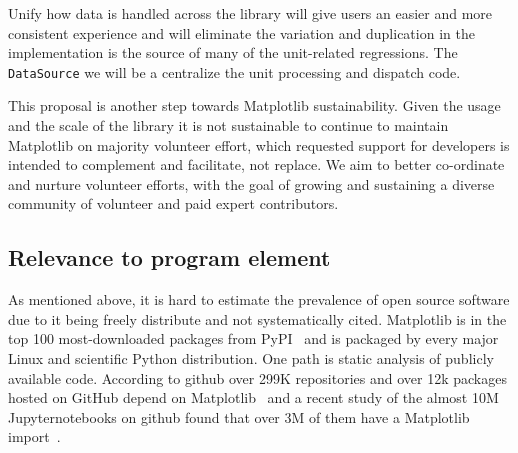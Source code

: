 \documentclass[12pt]{article}
\numberwithin{page}{section}
\begin{document}
Unify how data is handled across the library will give users an easier
and more consistent experience and will eliminate the variation and
duplication in the implementation is the source of many of the
unit-related regressions.  The \texttt{DataSource} we will be a
centralize the unit processing and dispatch code.


This proposal is another step towards Matplotlib sustainability.
Given the usage and the scale of the library it is not sustainable to
continue to maintain Matplotlib on majority volunteer effort, which
requested support for developers is intended to complement and
facilitate, not replace.  We aim to better co-ordinate and nurture
volunteer efforts, with the goal of growing and sustaining a diverse
community of volunteer and paid expert contributors.


\subsection{Relevance to program element}

As mentioned above, it is hard to estimate the prevalence of open
source software due to it being freely distribute and not
systematically cited.  Matplotlib is in the top 100 most-downloaded
packages from PyPI~\cite{pypi_stats} and is packaged by every major
Linux and scientific Python distribution.  One path is static analysis
of publicly available code.  According to github over 299K
repositories and over 12k packages hosted on GitHub depend on
Matplotlib~\cite{gh_deps:2021} and a recent study of the almost 10M
Jupyternotebooks on github found that over 3M of them have a
Matplotlib import~\cite{datalore:2020}.
\end{document}
